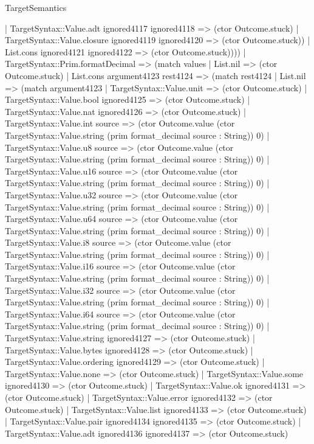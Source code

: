 \begin{lexlean}{TargetSemantics}
\begin{semanticmodule}
{            | TargetSyntax::Value.adt ignored4117 ignored4118 => (ctor Outcome.stuck)
            | TargetSyntax::Value.closure ignored4119 ignored4120 => (ctor Outcome.stuck))
          | List.cons ignored4121 ignored4122 => (ctor Outcome.stuck))))
    | TargetSyntax::Prim.formatDecimal => (match values
      | List.nil => (ctor Outcome.stuck)
      | List.cons argument4123 rest4124 => (match rest4124
        | List.nil => (match argument4123
          | TargetSyntax::Value.unit => (ctor Outcome.stuck)
          | TargetSyntax::Value.bool ignored4125 => (ctor Outcome.stuck)
          | TargetSyntax::Value.nat ignored4126 => (ctor Outcome.stuck)
          | TargetSyntax::Value.int source => (ctor Outcome.value (ctor TargetSyntax::Value.string (prim format_decimal source : String)) 0)
          | TargetSyntax::Value.u8 source => (ctor Outcome.value (ctor TargetSyntax::Value.string (prim format_decimal source : String)) 0)
          | TargetSyntax::Value.u16 source => (ctor Outcome.value (ctor TargetSyntax::Value.string (prim format_decimal source : String)) 0)
          | TargetSyntax::Value.u32 source => (ctor Outcome.value (ctor TargetSyntax::Value.string (prim format_decimal source : String)) 0)
          | TargetSyntax::Value.u64 source => (ctor Outcome.value (ctor TargetSyntax::Value.string (prim format_decimal source : String)) 0)
          | TargetSyntax::Value.i8 source => (ctor Outcome.value (ctor TargetSyntax::Value.string (prim format_decimal source : String)) 0)
          | TargetSyntax::Value.i16 source => (ctor Outcome.value (ctor TargetSyntax::Value.string (prim format_decimal source : String)) 0)
          | TargetSyntax::Value.i32 source => (ctor Outcome.value (ctor TargetSyntax::Value.string (prim format_decimal source : String)) 0)
          | TargetSyntax::Value.i64 source => (ctor Outcome.value (ctor TargetSyntax::Value.string (prim format_decimal source : String)) 0)
          | TargetSyntax::Value.string ignored4127 => (ctor Outcome.stuck)
          | TargetSyntax::Value.bytes ignored4128 => (ctor Outcome.stuck)
          | TargetSyntax::Value.ordering ignored4129 => (ctor Outcome.stuck)
          | TargetSyntax::Value.none => (ctor Outcome.stuck)
          | TargetSyntax::Value.some ignored4130 => (ctor Outcome.stuck)
          | TargetSyntax::Value.ok ignored4131 => (ctor Outcome.stuck)
          | TargetSyntax::Value.error ignored4132 => (ctor Outcome.stuck)
          | TargetSyntax::Value.list ignored4133 => (ctor Outcome.stuck)
          | TargetSyntax::Value.pair ignored4134 ignored4135 => (ctor Outcome.stuck)
          | TargetSyntax::Value.adt ignored4136 ignored4137 => (ctor Outcome.stuck)
}
\end{semanticmodule}
\end{lexlean}
